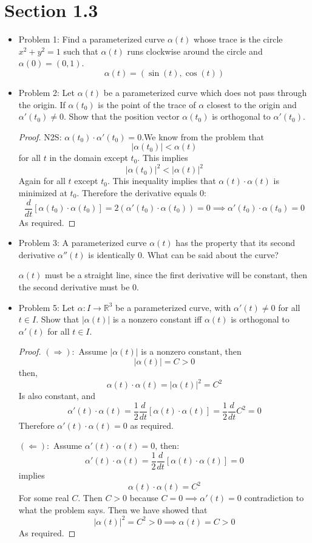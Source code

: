 \documentclass[a4paper,17pt]{extarticle}
\title{\scalebox{2}{Math 553 Homework 1}}
\author{\scalebox{1.5}{Theo Koss}}
\date{February 2022}
\theoremstyle{definition}
\renewcommand{\skip}{\par\null\par}
\newcommand{\R}{\mathbb{R}}
\begin{document}
\maketitle
\section{Section 1.3}
\begin{itemize}
    \item Problem 1: Find a parameterized curve $\alpha(t)$ whose trace is the circle $x^2+y^2=1$ such that $\alpha(t)$ runs clockwise around the circle and $\alpha(0)=(0,1)$. $$\alpha(t)=(\sin(t),\cos(t))$$
    \item Problem 2: Let $\alpha(t)$ be a parameterized curve which does not pass through the origin. If $\alpha(t_0)$ is the point of the trace of $\alpha$ closest to the origin and $\alpha'(t_0)\neq0$. Show that the position vector $\alpha(t_0)$ is orthogonal to $\alpha'(t_0)$. \begin{proof}N2S: $\alpha(t_0)\cdot\alpha'(t_0)=0$.\newline We know from the problem that $$|\alpha(t_0)|<\alpha(t)$$ for all $t$ in the domain except $t_0$. This implies $$|\alpha(t_0)|^2<|\alpha(t)|^2$$ Again for all $t$ except $t_0$. This inequality implies that $\alpha(t)\cdot\alpha(t)$ is minimized at $t_0$. Therefore the derivative equals 0: $$\frac{d}{dt}[\alpha(t_0)\cdot\alpha(t_0)]=2(\alpha'(t_0)\cdot\alpha(t_0))=0\implies \alpha'(t_0)\cdot\alpha(t_0)=0$$ As required.
    \end{proof}
    \item Problem 3: A parameterized curve $\alpha(t)$ has the property that its second derivative $\alpha''(t)$ is identically 0. What can be said about the curve?\skip $\alpha(t)$ must be a straight line, since the first derivative will be constant, then the second derivative must be 0.
    \item Problem 5: Let $\alpha:I\to\R^3$ be a parameterized curve, with $\alpha'(t)\neq0$ for all $t\in I$. Show that $|\alpha(t)|$ is a nonzero constant iff $\alpha(t)$ is orthogonal to $\alpha'(t)$ for all $t\in I$. \begin{proof}$(\Longrightarrow):$ Assume $|\alpha(t)|$ is a nonzero constant, then $$|\alpha(t)|=C>0$$ then, $$\alpha(t)\cdot\alpha(t)=|\alpha(t)|^2=C^2$$ Is also constant, and $$\alpha'(t)\cdot\alpha(t)=\frac{1}{2}\frac{d}{dt}[\alpha(t)\cdot\alpha(t)]=\frac{1}{2}\frac{d}{dt}C^2=0$$ Therefore $\alpha'(t)\cdot\alpha(t)=0$ as required.\skip $(\Longleftarrow):$ Assume $\alpha'(t)\cdot\alpha(t)=0$, then: $$\alpha'(t)\cdot\alpha(t)=\frac{1}{2}\frac{d}{dt}[\alpha(t)\cdot\alpha(t)]=0$$ implies $$\alpha(t)\cdot\alpha(t)=C^2$$ For some real $C$. Then $C>0$ because $C=0\implies\alpha'(t)=0$ contradiction to what the problem says. Then we have showed that $$|\alpha(t)|^2=C^2>0\implies \alpha(t)=C>0$$ As required.
    \end{proof}
\end{itemize}
\end{document}
